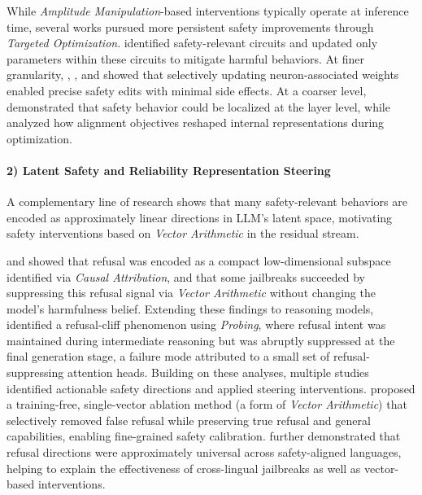 \documentclass[11pt,letterpaper]{mystyle}
\begin{document}
  While \textit{Amplitude Manipulation}-based interventions typically operate at inference time, several works pursued more persistent safety improvements through \textit{Targeted Optimization}. \citet{huang-etal-2025-pierce} identified safety-relevant circuits and updated only parameters within these circuits to mitigate harmful behaviors. At finer granularity, \citet{zhao2025understanding}, \citet{chen2025towards}, and \citet{liPrecisionKnowledgeEditing2024} showed that selectively updating neuron-associated weights enabled precise safety edits with minimal side effects. At a coarser level, \citet{li2025safety} demonstrated that safety behavior could be localized at the layer level, while \citet{leeMechanisticUnderstandingAlignment2024} analyzed how alignment objectives reshaped internal representations during optimization.
  
  
  \paragraph{2) Latent Safety and Reliability Representation Steering}
  
  A complementary line of research shows that many safety-relevant behaviors are encoded as approximately linear directions in LLM's latent space, motivating safety interventions based on \textit{Vector Arithmetic} in the residual stream.
  
  \citet{arditi2024refusal} and \citet{zhao2025llms} showed that refusal was encoded as a compact low-dimensional subspace identified via \textit{Causal Attribution}, and that some jailbreaks succeeded by suppressing this refusal signal via \textit{Vector Arithmetic} without changing the model’s harmfulness belief. Extending these findings to reasoning models, \citet{yin2025refusalfallscliffsafety} identified a refusal-cliff phenomenon using \textit{Probing}, where refusal intent was maintained during intermediate reasoning but was abruptly suppressed at the final generation stage, a failure mode attributed to a small set of refusal-suppressing attention heads.
  Building on these analyses, multiple studies identified actionable safety directions and applied steering interventions. \citet{wang2025surgical} proposed a training-free, single-vector ablation method (a form of \textit{Vector Arithmetic}) that selectively removed false refusal while preserving true refusal and general capabilities, enabling fine-grained safety calibration. \citet{wang2025refusal} further demonstrated that refusal directions were approximately universal across safety-aligned languages, helping to explain the effectiveness of cross-lingual jailbreaks as well as vector-based interventions.
  
\end{document}
